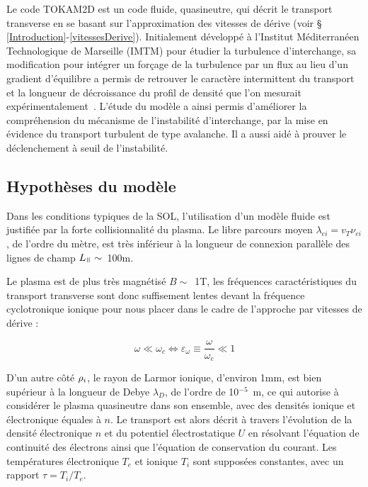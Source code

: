 \begin{refsection}
Le code TOKAM2D est un code fluide, quasineutre, qui décrit le transport
transverse en se basant sur l'approximation des vitesses de dérive (voir §
\ref{Introduction}-\ref{vitessesDerive}). Initialement développé à
l'Institut Méditerranéen Technologique de Marseille (IMTM) pour étudier
la turbulence d'interchange, sa modification pour intégrer un forçage de la turbulence
par un flux au lieu d'un gradient d'équilibre a permis de retrouver le
caractère intermittent du transport et la longueur de décroissance du profil de
densité que l'on mesurait expérimentalement~\cite{SarazinPhD}. L'étude du modèle a
ainsi permis d'améliorer la compréhension du mécanisme de l'instabilité
d'interchange, par la mise en évidence du transport turbulent de type
avalanche. Il a aussi aidé à prouver le déclenchement à seuil de
l'instabilité.

\subsection{Hypothèses du modèle}
Dans les conditions typiques de la SOL, l'utilisation d'un modèle fluide est
justifiée par la forte collisionnalité du plasma. Le libre parcours moyen
$\lambda_{ei}=v_T \nu_{ei}$, de l'ordre du mètre, est très inférieur à la
longueur de connexion parallèle des lignes de champ $L_\para\sim
$~100m.

Le plasma est de plus très magnétisé $B\sim$~1T, les fréquences
caractéristiques du transport transverse sont donc suffisement lentes devant la
fréquence cyclotronique ionique pour nous placer dans le cadre de
l'approche par vitesses de dérive :

\begin{equation}
\omega\ll\omega_c\Leftrightarrow \varepsilon_\omega\equiv\frac{\omega}{\omega_c}\ll 1
\end{equation}

D'un autre côté $\rho{_{i}}$, le rayon de Larmor ionique, d'environ
1mm, est bien supérieur à la longueur de
Debye $\lambda_D$, de l'ordre de 10$^{-5}$~m, ce qui autorise à
considérer le plasma quasineutre dans son ensemble, avec des densités ionique
et électronique équales à $n$.
Le transport est alors décrit à travers l'évolution de la densité
électronique $n$ et du potentiel électrostatique $U$ en résolvant l'équation
de continuité des électrons ainsi que l'équation de conservation du courant. Les
températures électronique
$T_e$ et ionique $T_i$ sont supposées constantes, avec un rapport $\tau=T_i/T_e$.


\end{refsection}
